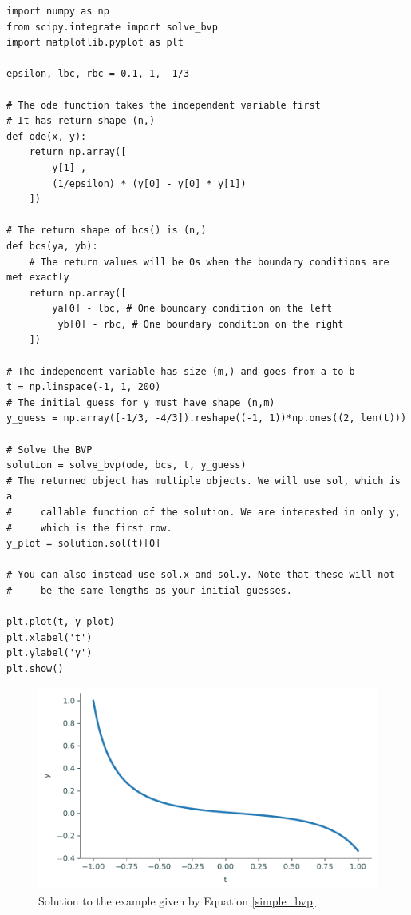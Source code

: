 \begin{lstlisting}
import numpy as np
from scipy.integrate import solve_bvp
import matplotlib.pyplot as plt

epsilon, lbc, rbc = 0.1, 1, -1/3

# The ode function takes the independent variable first
# It has return shape (n,)
def ode(x, y):
    return np.array([
        y[1] ,
        (1/epsilon) * (y[0] - y[0] * y[1])
    ])

# The return shape of bcs() is (n,)
def bcs(ya, yb):
    # The return values will be 0s when the boundary conditions are met exactly
    return np.array([
    	ya[0] - lbc, # One boundary condition on the left
         yb[0] - rbc, # One boundary condition on the right
    ])

# The independent variable has size (m,) and goes from a to b
t = np.linspace(-1, 1, 200)
# The initial guess for y must have shape (n,m)
y_guess = np.array([-1/3, -4/3]).reshape((-1, 1))*np.ones((2, len(t)))

# Solve the BVP
solution = solve_bvp(ode, bcs, t, y_guess)
# The returned object has multiple objects. We will use sol, which is a
#     callable function of the solution. We are interested in only y,
#     which is the first row.
y_plot = solution.sol(t)[0]

# You can also instead use sol.x and sol.y. Note that these will not
#     be the same lengths as your initial guesses.

plt.plot(t, y_plot)
plt.xlabel('t')
plt.ylabel('y')
plt.show()
\end{lstlisting}
\begin{figure}[H]
    \centering
    \includegraphics[width=\textwidth]{figures/bvp_example.pdf}
    \caption{Solution to the example given by Equation \eqref{simple_bvp}}
    \label{bvp_ex}
\end{figure}

